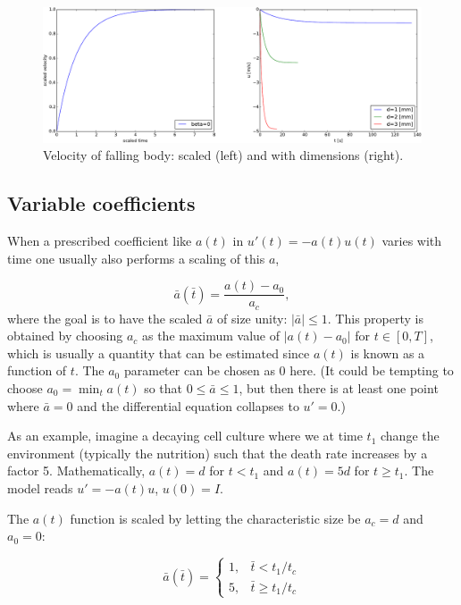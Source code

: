 \documentclass[graybox,envcountchap,sectrefs,final]{svmonodo}
\begin{document}
\begin{figure}[!ht]  %
  \centerline{\includegraphics[width=1.0\linewidth]{fig-scaling/falling_body.pdf}}
  \caption{
  Velocity of falling body: scaled (left) and with dimensions (right). \label{sec:scale:decay:body:fig}
  }
\end{figure}



\subsection{Variable coefficients}
\label{sec:scale:decay:jump}

When a prescribed coefficient like $a(t)$ in $u'(t) = -a(t)u(t)$
varies with time one usually also
performs a scaling of this $a$,

\[ \bar a(\bar t) = \frac{a(t) - a_0}{a_c}, \]
where the goal is to have the scaled $\bar a$
of size unity: $|\bar a|\leq 1$.
This property is obtained by choosing $a_c$ as the maximum value
of $|a(t)-a_0|$ for $t\in [0,T]$, which is usually a quantity that
can be estimated since $a(t)$ is known as a function of $t$. The $a_0$
parameter can be chosen as 0 here. (It could be tempting to
choose $a_0=\min_t a(t)$ so that $0\leq \bar a\leq 1$, but then there
is at least one point where $\bar a = 0$ and
the differential equation collapses to $u'=0$.)

As an example, imagine a decaying cell culture where we at time $t_1$
change the environment (typically the nutrition)
such that the death rate increases by a factor 5.
Mathematically, $a(t) = d$ for
$t < t_1$ and $a(t)=5d$ for $t\geq t_1$. The model reads $u'=-a(t)u$, $u(0)=I$.

The $a(t)$ function is scaled by letting the characteristic size be
$a_c=d$ and $a_0=0$:

\[ \bar a (\bar t) = \left\lbrace\begin{array}{ll}
1, & \bar t < t_1/t_c\\ 
5, & \bar t \geq t_1/t_c
\end{array}\right.
\]
\end{document}
